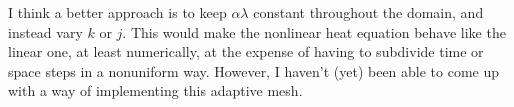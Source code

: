 \documentclass[11pt]{amsart}
\begin{document}
 
I think a better approach is to keep $\alpha\lambda$ constant throughout the domain, and instead vary $k$ or $j$. This would make the nonlinear heat equation behave like the linear one, at least numerically, at the expense of having to subdivide time or space steps in a nonuniform way. However, I haven't (yet) been able to come up with a way of implementing this adaptive mesh. 
\end{document}
